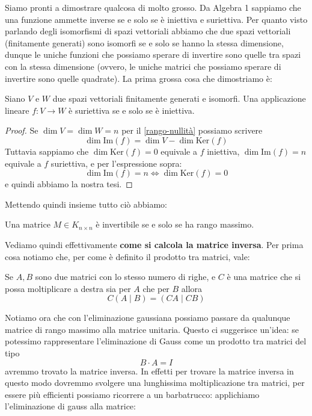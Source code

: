 \documentclass[11pt]{scrartcl}
\newcommand{\Immagine}[1]{\text{Im}\left(#1\right)}
\renewcommand{\ker}[1]{\text{Ker}\left(#1\right)}
\begin{document}
  	 Siamo pronti a dimostrare qualcosa di molto grosso. Da Algebra 1 sappiamo che una funzione ammette inverse se e solo se è iniettiva e suriettiva. Per quanto visto parlando degli isomorfismi di spazi vettoriali abbiamo che due spazi vettoriali (finitamente generati) sono isomorfi se e solo se hanno la stessa dimensione, dunque le uniche funzioni che possiamo sperare di invertire sono quelle tra spazi con la stessa dimensione (ovvero, le uniche matrici che possiamo sperare di invertire sono quelle quadrate). La prima grossa cosa che dimostriamo è:
  	 \begin{lemma}
  	 	Siano $V$ e $W$ due spazi vettoriali finitamente generati e isomorfi. Una applicazione lineare $f:V\to W$ è suriettiva se e solo se è iniettiva.
  	 \end{lemma}
  	 \begin{proof}
  	 	Se $\dim V=\dim W=n$ per il \ref{rango-nullità} possiamo scrivere
  	 	$$\dim\Immagine{f}=\dim V-\dim\ker{f}$$
  	 	Tuttavia sappiamo che $\dim\ker{f}=0$ equivale a $f$ iniettiva, $\dim\Immagine{f}=n$ equivale a $f$ suriettiva, e per l'espressione sopra: 
  	 	$$\dim\Immagine{f}=n \iff \dim\ker{f}=0$$
  	 	e quindi abbiamo la nostra tesi.
  	 \end{proof}
  	 Mettendo quindi insieme tutto ciò abbiamo:
  	 \begin{corollary}
  	 	Una matrice $M\in K_{n\times n}$ è invertibile se e solo se ha rango massimo.
  	 \end{corollary}
  	 Vediamo quindi effettivamente \textbf{come si calcola la matrice inversa}. Per prima cosa notiamo che, per come è definito il prodotto tra matrici, vale:
  	 \begin{proposition}\label{distribuitività del prodotto sull'unione}
  	 	Se $A,B$ sono due matrici con lo stesso numero di righe, e  $C$ è una matrice che si possa moltiplicare a destra sia per $A$ che per $B$ allora 
  	 	$$C(A\mid B)=(CA\mid CB)$$
  	 \end{proposition}
  	 Notiamo ora che con l'eliminazione gaussiana possiamo passare da qualunque matrice di rango massimo alla matrice unitaria. Questo ci suggerisce un'idea: se potessimo rappresentare l'eliminazione di Gauss come un prodotto tra matrici del tipo
  	 $$B\cdot A=I$$
  	 avremmo trovato la matrice inversa. In effetti per trovare la matrice inversa in questo modo dovremmo svolgere una lunghissima moltiplicazione tra matrici, per essere più efficienti possiamo ricorrere a un barbatrucco: applichiamo l'eliminazione di gauss alla matrice:
\end{document}
